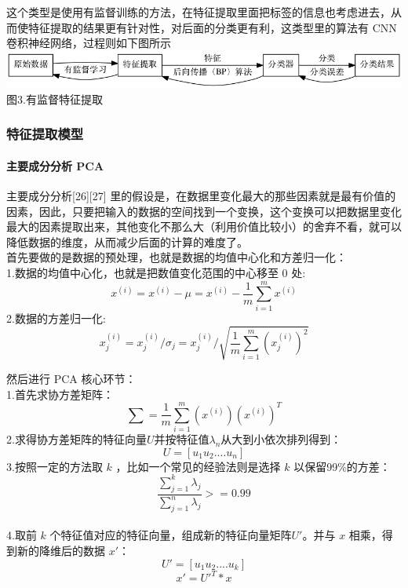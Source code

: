 这个类型是使用有监督训练的方法，在特征提取里面把标签的信息也考虑进去，从而使特征提取的结果更有针对性，对后面的分类更有利，这类型里的算法有
CNN
卷积神经网络，过程则如下图所示\\\includegraphics{picture/learning-framework3.png}\\图3.有监督特征提取

\subsubsection{特征提取模型}\label{ux7279ux5f81ux63d0ux53d6ux6a21ux578b}

\paragraph{主要成分分析
PCA}\label{ux4e3bux8981ux6210ux5206ux5206ux6790-pca}

主要成分分析{[}26{]}{[}27{]}
里的假设是，在数据里变化最大的那些因素就是最有价值的因素，因此，只要把输入的数据的空间找到一个变换，这个变换可以把数据里变化最大的因素提取出来，其他变化不那么大（利用价值比较小）的舍弃不看，就可以降低数据的维度，从而减少后面的计算的难度了。\\首先要做的是数据的预处理，也就是数据的均值中心化和方差归一化：\\1.数据的均值中心化，也就是把数值变化范围的中心移至
0
处:\\\[ x^{(i)} = x^{(i)} - \mu = x^{(i)} - \frac{1}{m} \sum_{i=1}^m {x^{(i)}}\]
2.数据的方差归一化:\\\[ x_j^{(i)} = x_j^{(i)} / \sigma_j = x_j^{(i)} / \sqrt{\frac{1}{m} \sum_{i=1}^m {(x_{j}^{(i)})^2}} \]

然后进行 PCA 核心环节：\\1.首先求协方差矩阵：
\[\sum = \frac{1}{m} \sum_{i=1}^{m}(x^{(i)})(x^{(i)})^T\]
2.求得协方差矩阵的特征向量\(U\)并按特征值\(\lambda_n\)从大到小依次排列得到：\\\[U=[u_1 u_2 .... u_n]\]
3.按照一定的方法取 \(k\) ，比如一个常见的经验法则是选择 \(k\)
以保留99\%的方差：
\[\frac{\sum^{k}_{j=1}\lambda_j}{\sum^{n}_{j=1}\lambda_j} >= 0.99\]\\4.取前
\(k\) 个特征值对应的特征向量，组成新的特征向量矩阵\(U'\)。并与 \(x\)
相乘，得到新的降维后的数据 \(x'\)：\\\[U' = [u_1 u_2 .... u_k]\]
\[x' = U'^T * x\]

